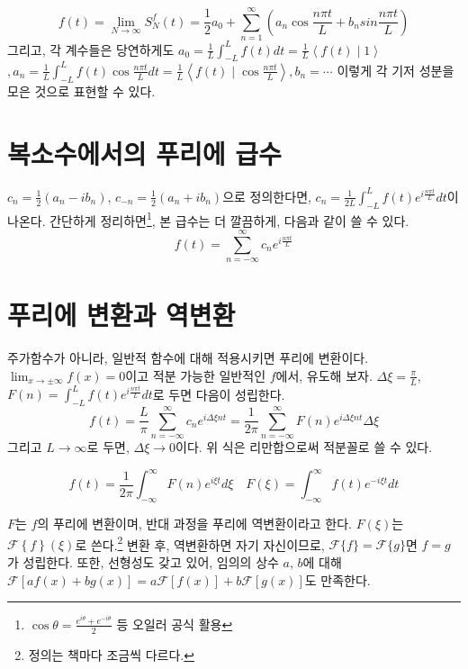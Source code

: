 \documentclass[article, oneside]{oblivoir}
\begin{document}
\begin{equation}
    f(t) = \lim_{N \to \infty} S_N^f (t) = \frac{1}{2} a_0 + \sum_{n=1}^{\infty} \left( a_n \cos \frac{n \pi t}{L} + b_n sin \frac{n \pi t}{L}\right)
\end{equation}
그리고, 각 계수들은 당연하게도
$a_0 = \frac{1}{L} \int_{-L}^{L} f(t)dt
= \frac{1}{L} \left\langle f(t) \mid 1\right\rangle$$
, a_n = \frac{1}{L} \int_{-L}^{L} f(t) \cos\frac{n \pi t}{L}dt 
=\frac{1}{L} \left\langle f(t) \mid \cos\frac{n \pi t}{L}\right\rangle, b_n = \cdots$ 이렇게 각 기저 성분을 모은 것으로 표현할 수 있다.

\section{복소수에서의 푸리에 급수}
$c_n = \frac{1}{2}\left(a_n - ib_n\right)$, $c_{-n} = \frac{1}{2}\left(a_n + ib_n\right)$으로 정의한다면, $c_n = \frac{1}{2L}\int_{-L}^{L} f(t)e^{i\frac{n \pi t}{L}} dt$이 나온다. 간단하게 정리하면\footnote{$\cos \theta = \frac{e^{i \theta} + e^{-i \theta}}{2}$ 등 오일러 공식 활용}, 본 급수는 더 깔끔하게, 다음과 같이 쓸 수 있다.
\begin{equation}
    f(t) = \sum_{n=-\infty}^{\infty} c_n e^{i \frac{n \pi t}{L}}
\end{equation}

\section{푸리에 변환과 역변환}

주가함수가 아니라, 일반적 함수에 대해 적용시키면 푸리에 변환이다. $\lim_{x \to \pm \infty}f(x)=0$이고 적분 가능한 일반적인 $f$에서,  유도해 보자.
$\Delta \xi = \frac{\pi}{L}$, $F(n) = \int_{-L}^{L} f(t)e^{i\frac{n \pi t}{L}} dt$로 두면 다음이 성립한다. 
$$f(t) = \frac{L}{\pi} \sum_{n=-\infty}^{\infty} c_n e^{i \Delta \xi n t} = \frac{1}{2\pi} \sum_{n=-\infty}^{\infty} F(n) e^{i  \Delta \xi n t} \Delta \xi$$
그리고 $L \to \infty$로 두면, $\Delta \xi \to 0$이다. 위 식은 리만합으로써 적분꼴로 쓸 수 있다.

\begin{equation}
    f(t) = \frac{1}{2\pi} \int_{-\infty}^{\infty} F(n) e^{i \xi t}d\xi \quad F(\xi) = \int_{-\infty}^{\infty} f(t)e^{-i \xi t}dt
\end{equation}

$F$는 $f$의 푸리에 변환이며, 반대 과정을 푸리에 역변환이라고 한다. $F(\xi)$는 $\mathcal{F}\left\{f\right\}(\xi)$로 쓴다.\footnote{정의는 책마다 조금씩 다르다.} 변환 후, 역변환하면 자기 자신이므로, $\mathcal{F}\{f\} = \mathcal{F}\{g\}$면 $f=g$가 성립한다.
또한, 선형성도 갖고 있어, 임의의 상수 $a$, $b$에 대해 $\mathcal{F} \left[af(x)+bg(x)\right]=a\mathcal{F} \left[f(x)\right]+b\mathcal{F} \left[g(x)\right]$도 만족한다.
\end{document}
